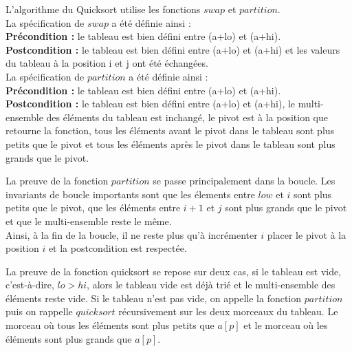 \documentclass[11pt,openany]{article}
\begin{document}
		L'algorithme du Quicksort utilise les fonctions $swap$ et $partition$.\\ La sp\'ecification de $swap$ a \'et\'e d\'efinie ainsi :\\
		\textbf{Pr\'econdition :} le tableau est bien d\'efini entre (a+lo) et (a+hi).\\
		\textbf{Postcondition :} le tableau est bien d\'efini entre (a+lo) et (a+hi) et les valeurs du tableau \`a la position i et j ont \'et\'e \'echang\'ees. \\
La sp\'ecification de $partition$ a \'et\'e d\'efinie ainsi :\\
		\textbf{Pr\'econdition :} le tableau est bien d\'efini entre (a+lo) et (a+hi).\\
		\textbf{Postcondition :} le tableau est bien d\'efini entre (a+lo) et (a+hi), le multi-ensemble des \'el\'ements du tableau est inchang\'e, le pivot est \`a la position que retourne la fonction, tous les \'el\'ements avant le pivot dans le tableau sont plus petits que le pivot et tous les \'el\'ements apr\`es le pivot dans le tableau sont plus grands que le pivot.
		
		La preuve de la fonction $partition$ se passe principalement dans la boucle. Les invariants de boucle importants sont que les \'elements entre $low$ et $i$ sont plus petits que le pivot, que les \'el\'ements entre $i+1$ et $j$ sont plus grands que le pivot et que le multi-ensemble reste le m\^eme.\\
		Ainsi, \`a la fin de la boucle, il ne reste plus qu'\`a incr\'ementer $i$ placer le pivot \`a la position $i$ et la postcondition est respect\'ee.
		
		La preuve de la fonction quicksort se repose sur deux cas, si le tableau est vide, c'est-\`a-dire, $lo > hi$, alors le tableau vide est d\'ej\`a tri\'e et le multi-ensemble des \'el\'ements reste vide. Si le tableau n'est pas vide, on appelle la fonction $partition$ puis on rappelle $quicksort$ r\'ecursivement sur les deux morceaux du tableau. Le morceau o\`u tous les \'el\'ements sont plus petits que $a[p]$ et le morceau o\`u les \'el\'ements sont plus grands que $a[p]$.
		
\end{document}
